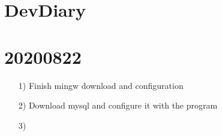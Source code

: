 \documentclass{article}
\begin{document}
\section{DevDiary}
\section{20200822}
\begin{enumerate}
    \item[1)] 
    Finish mingw download and configuration
    \item[2)] 
    Download mysql and configure it with the program
    \item[3)] 
     
\end{enumerate}






\end{document}
